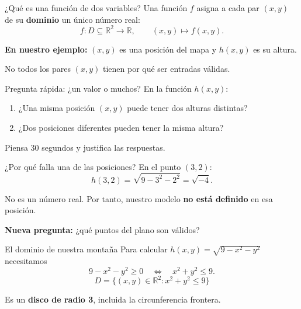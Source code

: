 \documentclass[main.tex]{subfiles}
\begin{document}
\begin{frame}{¿Qué es una función de dos variables?}
Una función $f$ asigna a cada par $(x,y)$ de su \textbf{dominio} un único número real:
\[
 f:D\subseteq\mathbb R^2\longrightarrow\mathbb R,
 \qquad (x,y)\longmapsto f(x,y).
\]
\medskip

\textbf{En nuestro ejemplo:} $(x,y)$ es una posición del mapa y $h(x,y)$ es su altura.
\medskip

No todos los pares $(x,y)$ tienen por qué ser entradas válidas.
\end{frame}

\begin{frame}{Pregunta rápida: ¿un valor o muchos?}
En la función $h(x,y)$:
\begin{enumerate}
\item ¿Una misma posición $(x,y)$ puede tener dos alturas distintas?
\medskip
\item ¿Dos posiciones diferentes pueden tener la misma altura?
\end{enumerate}
\vfill
\alert{Piensa 30 segundos y justifica las respuestas.}
\end{frame}

\begin{frame}{¿Por qué falla una de las posiciones?}
En el punto $(3,2)$:
\[
 h(3,2)=\sqrt{9-3^2-2^2}=\sqrt{-4}.
\]
\medskip

No es un número real. Por tanto, nuestro modelo \textbf{no está definido} en esa posición.
\medskip

\textbf{Nueva pregunta:} ¿qué puntos del plano son válidos?
\end{frame}

\begin{frame}{El dominio de nuestra montaña}
Para calcular $h(x,y)=\sqrt{9-x^2-y^2}$ necesitamos
\[
9-x^2-y^2\geq0
\quad\Longleftrightarrow\quad
x^2+y^2\leq9.
\]
\[
\boxed{D=\{(x,y)\in\mathbb R^2:x^2+y^2\leq9\}}
\]
\medskip

Es un \textbf{disco de radio 3}, incluida la circunferencia frontera.
\end{frame}
\end{document}
